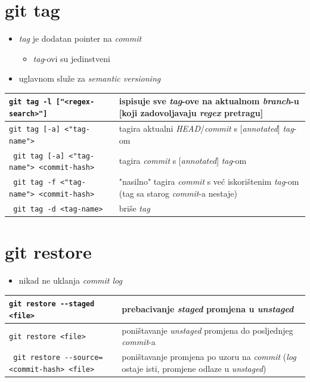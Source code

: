 \documentclass[10pt]{article}
\begin{document}
    \section*{\color{BrickRed} git tag}
    \begin{itemize}
        \item \textit{tag} je dodatan pointer na \textit{commit}
        \begin{itemize}
            \item \textit{tag}-ovi su jedinstveni
        \end{itemize}
        \item uglavnom služe za \textit{semantic versioning}
    \end{itemize}
    \begin{tabular}{|>{\tt}p{9.25cm}|>{}p{15.50cm}|}
        \hline
        git tag -l ["<regex-search>"]                   & ispisuje sve \textit{tag}-ove na aktualnom \textit{branch}-u [koji zadovoljavaju \textit{regex} pretragu] \\ \hline
        git tag [-a] <"tag-name">                       & tagira aktualni \textit{HEAD}/\textit{commit} s [\textit{annotated}] \textit{tag}-om \\ \hline
        git tag [-a] <"tag-name"> <commit-hash>         & tagira \textit{commit} s [\textit{annotated}] \textit{tag}-om \\ \hline
        git tag -f <"tag-name"> <commit-hash>           & "nasilno" tagira \textit{commit} s već iskorištenim \textit{tag}-om (tag sa starog \textit{commit}-a nestaje) \\ \hline
        git tag -d <tag-name>                           & briše \textit{tag} \\ \hline
    \end{tabular}

    \section*{\color{BrickRed} git restore}
    \begin{itemize}
        \item nikad ne uklanja \textit{commit log}
    \end{itemize}
    \begin{tabular}{|>{\tt}p{9.25cm}|>{}p{15.50cm}|}
        \hline
        git restore -{}-staged <file>                   & prebacivanje \textit{staged} promjena u \textit{unstaged} \\ \hline
        git restore <file>                              & poništavanje \textit{unstaged} promjena do posljednjeg \textit{commit}-a \\ \hline
        git restore -{}-source=<commit-hash> <file>     & poništavanje promjena po uzoru na \textit{commit} (\textit{log} ostaje isti, promjene odlaze u \textit{unstaged}) \\ \hline
    \end{tabular}
\end{document}
